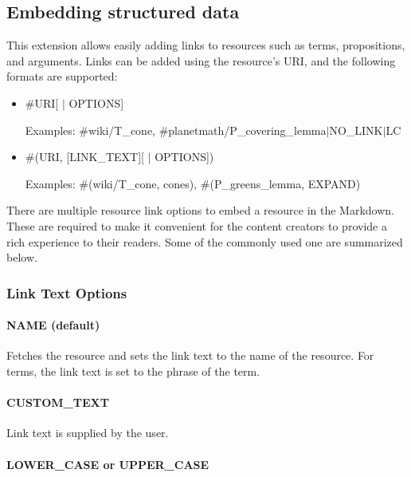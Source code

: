 \documentclass[a4paper]{article}
\begin{document}
\subsection{Embedding structured data}

This extension allows easily adding links to resources such as terms, propositions, and arguments. Links can be added using the resource's URI, and the following formats are supported:


\begin{itemize}

	\item \#URI[ $\vert$ OPTIONS]


	Examples: \#wiki/T\_cone, \#planetmath/P\_covering\_lemma$\vert$NO\_LINK$\vert$LC

	\item \#(URI, [\textquotesingle LINK\_TEXT\textquotesingle][ $\vert$ OPTIONS])

	

	Examples: \#(wiki/T\_cone, \textquotesingle cones\textquotesingle), \#(P\_greens\_lemma, EXPAND)

\end{itemize}


There are multiple resource link options to embed a resource in the Markdown. These are required to make it convenient for the content creators to provide a rich experience to their readers. Some of the commonly used one are summarized below.

\subsubsection{Link Text Options}

\paragraph{NAME (default)}

Fetches the resource and sets the link text to the name of the resource. For terms, the link text is set to the phrase of the term.

\paragraph{CUSTOM\_TEXT}
Link text is supplied by the user.

\paragraph{LOWER\_CASE or UPPER\_CASE}
\end{document}

